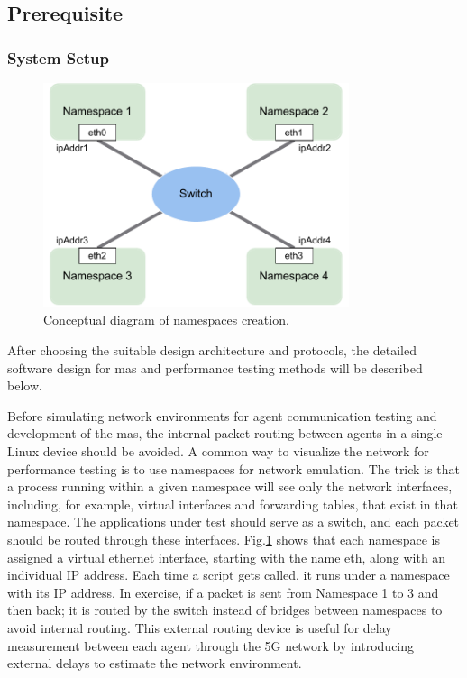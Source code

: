 \subsection{Prerequisite}
\subsubsection{System Setup}
 

\begin{figure}[htbp]
\includegraphics[width=0.8\textwidth]{figures/NamespaceConceptual.pdf}
\centering
\caption{Conceptual diagram of namespaces creation.
\label{fig: NSConceptual}}
\end{figure}

After choosing the suitable design architecture and protocols, the detailed 
software design for \gls{mas} and performance testing methods will be described below. 

Before simulating network environments for agent communication testing 
and development of the \gls{mas}, the internal packet routing between agents 
in a single Linux device should be avoided. A common way to visualize 
the network for performance testing is to use namespaces for network 
emulation. The trick is that a process running within a given
namespace will see only the network interfaces, including, for example, 
virtual interfaces and forwarding tables, that exist in that namespace. 
The applications under test should serve as a
switch, and each packet should be routed through these interfaces. 
Fig.\ref{fig: NSConceptual} shows that each namespace is assigned 
a virtual ethernet interface, 
starting with the name eth, along with an individual IP address. 
Each time a script gets called, it runs under a namespace with its 
IP address. In exercise, if a packet is sent from
Namespace 1 to 3 and then back; it is routed by the switch instead of 
bridges between namespaces to avoid internal routing. This external routing 
device is useful for delay measurement between each agent through the 5G network 
by introducing external delays to estimate the network environment. 

